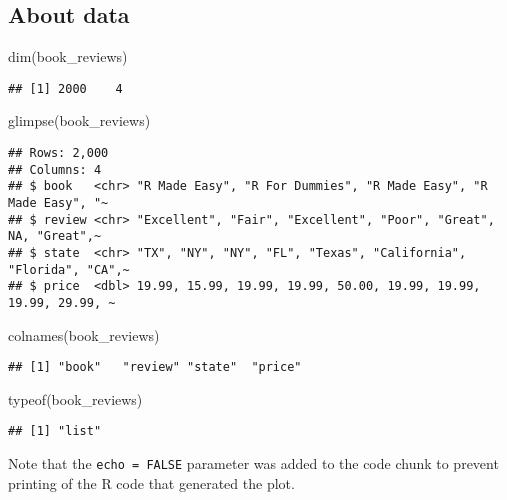 \documentclass[
]{article}
\newenvironment{Shaded}{\begin{snugshade}}{\end{snugshade}}
\newcommand{\FunctionTok}[1]{\textcolor[rgb]{0.00,0.00,0.00}{#1}}
\newcommand{\NormalTok}[1]{#1}
\begin{document}
\hypertarget{about-data}{%
\subsection{About data}\label{about-data}}

\begin{Shaded}
\begin{Highlighting}[]
\FunctionTok{dim}\NormalTok{(book\_reviews)}
\end{Highlighting}
\end{Shaded}

\begin{verbatim}
## [1] 2000    4
\end{verbatim}

\begin{Shaded}
\begin{Highlighting}[]
\FunctionTok{glimpse}\NormalTok{(book\_reviews)}
\end{Highlighting}
\end{Shaded}

\begin{verbatim}
## Rows: 2,000
## Columns: 4
## $ book   <chr> "R Made Easy", "R For Dummies", "R Made Easy", "R Made Easy", "~
## $ review <chr> "Excellent", "Fair", "Excellent", "Poor", "Great", NA, "Great",~
## $ state  <chr> "TX", "NY", "NY", "FL", "Texas", "California", "Florida", "CA",~
## $ price  <dbl> 19.99, 15.99, 19.99, 19.99, 50.00, 19.99, 19.99, 19.99, 29.99, ~
\end{verbatim}

\begin{Shaded}
\begin{Highlighting}[]
\FunctionTok{colnames}\NormalTok{(book\_reviews)}
\end{Highlighting}
\end{Shaded}

\begin{verbatim}
## [1] "book"   "review" "state"  "price"
\end{verbatim}

\begin{Shaded}
\begin{Highlighting}[]
\FunctionTok{typeof}\NormalTok{(book\_reviews)}
\end{Highlighting}
\end{Shaded}

\begin{verbatim}
## [1] "list"
\end{verbatim}

Note that the \texttt{echo\ =\ FALSE} parameter was added to the code
chunk to prevent printing of the R code that generated the plot.
\end{document}

